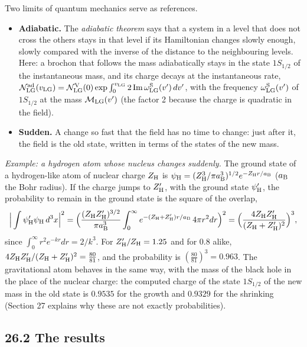 \documentclass[
  10pt,
]{article}
\providecommand{\tightlist}{%
  \setlength{\itemsep}{0pt}\setlength{\parskip}{0pt}}
\begin{document}
Two limits of quantum mechanics serve as references.

\begin{itemize}
\tightlist
\item
  \textbf{Adiabatic.} The \emph{adiabatic theorem} says that a system in
  a level that does not cross the others stays in that level if its
  Hamiltonian changes slowly enough, slowly compared with the inverse of
  the distance to the neighbouring levels. Here: a brochon that follows
  the mass adiabatically stays in the state \(1S_{1/2}\) of the
  instantaneous mass, and its charge decays at the instantaneous rate,
  \(\mathcal N^{\rm ad}_{\rm LG}(v_{\rm LG})=\mathcal N^{\rm V}_{\rm LG}(0)\exp\int_0^{v_{\rm LG}}2\,{\rm Im}\,\omega^{\rm S}_{\rm LG}(v')\,dv'\),
  with the frequency \(\omega^{\rm S}_{\rm LG}(v')\) of \(1S_{1/2}\) at
  the mass \(\mathcal M_{\rm LG}(v')\) (the factor 2 because the charge
  is quadratic in the field).
\item
  \textbf{Sudden.} A change so fast that the field has no time to
  change: just after it, the field is the old state, written in terms of
  the states of the new mass.
\end{itemize}

\emph{Example: a hydrogen atom whose nucleus changes suddenly.} The
ground state of a hydrogen-like atom of nuclear charge \(Z_{\rm H}\) is
\(\psi_{\rm H}=(Z_{\rm H}^3/\pi a_{\rm B}^3)^{1/2}e^{-Z_{\rm H}r/a_{\rm B}}\)
(\(a_{\rm B}\) the Bohr radius). If the charge jumps to \(Z'_{\rm H}\),
with the ground state \(\psi'_{\rm H}\), the probability to remain in
the ground state is the square of the overlap,
\[\Big\lvert\int\psi'_{\rm H}\psi_{\rm H}\,d^3x\Big\rvert^2=\Big(\frac{(Z_{\rm H}Z'_{\rm H})^{3/2}}{\pi a_{\rm B}^3}\int_0^\infty e^{-(Z_{\rm H}+Z'_{\rm H})r/a_{\rm B}}\,4\pi r^2dr\Big)^2=\Big(\frac{4Z_{\rm H}Z'_{\rm H}}{(Z_{\rm H}+Z'_{\rm H})^2}\Big)^3,\]
since \(\int_0^\infty r^2e^{-kr}dr=2/k^3\). For
\(Z'_{\rm H}/Z_{\rm H}=1.25\) and for \(0.8\) alike,
\(4Z_{\rm H}Z'_{\rm H}/(Z_{\rm H}+Z'_{\rm H})^2=\tfrac{80}{81}\), and
the probability is \((\tfrac{80}{81})^3=0.963\). The gravitational atom
behaves in the same way, with the mass of the black hole in the place of
the nuclear charge: the computed charge of the state \(1S_{1/2}\) of the
new mass in the old state is \(0.9535\) for the growth and \(0.9329\)
for the shrinking (Section 27 explains why these are not exactly
probabilities).

\hypertarget{the-results}{%
\subsection{26.2 The results}\label{the-results}}
\end{document}
